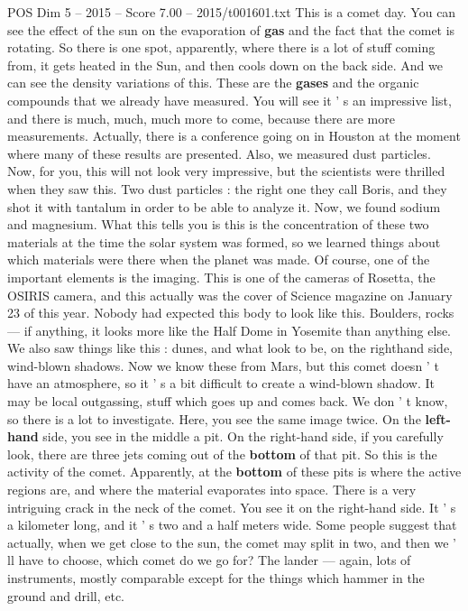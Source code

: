 \begin{textsample}{POS Dim 5 – 2015 – Score 7.00 – 2015/t001601.txt}
This is a comet day.
You can see the effect of the sun on the evaporation of \textbf{gas} and the fact that the comet is rotating.
So there is one spot, apparently, where there is a lot of stuff coming from, it gets heated in the Sun, and then cools down on the back side.
And we can see the density variations of this.
These are the \textbf{gases} and the organic compounds that we already have measured.
You will see it ' s an impressive list, and there is much, much, much more to come, because there are more measurements.
Actually, there is a conference going on in Houston at the moment where many of these results are presented.
Also, we measured dust particles.
Now, for you, this will not look very impressive, but the scientists were thrilled when they saw this.
Two dust particles : the right one they call Boris, and they shot it with tantalum in order to be able to analyze it.
Now, we found sodium and magnesium.
What this tells you is this is the concentration of these two materials at the time the solar system was formed, so we learned things about which materials were there when the planet was made.
Of course, one of the important elements is the imaging.
This is one of the cameras of Rosetta, the OSIRIS camera, and this actually was the cover of Science magazine on January 23 of this year.
Nobody had expected this body to look like this.
Boulders, rocks — if anything, it looks more like the Half Dome in Yosemite than anything else.
We also saw things like this : dunes, and what look to be, on the righthand side, wind-blown shadows.
Now we know these from Mars, but this comet doesn ' t have an atmosphere, so it ' s a bit difficult to create a wind-blown shadow.
It may be local outgassing, stuff which goes up and comes back.
We don ' t know, so there is a lot to investigate.
Here, you see the same image twice.
On the \textbf{left-hand} side, you see in the middle a pit.
On the right-hand side, if you carefully look, there are three jets coming out of the \textbf{bottom} of that pit.
So this is the activity of the comet.
Apparently, at the \textbf{bottom} of these pits is where the active regions are, and where the material evaporates into space.
There is a very intriguing crack in the neck of the comet.
You see it on the right-hand side.
It ' s a kilometer long, and it ' s two and a half meters wide.
Some people suggest that actually, when we get close to the sun, the comet may split in two, and then we ' ll have to choose, which comet do we go for?
The lander — again, lots of instruments, mostly comparable except for the things which hammer in the ground and drill, etc.

\end{textsample}
